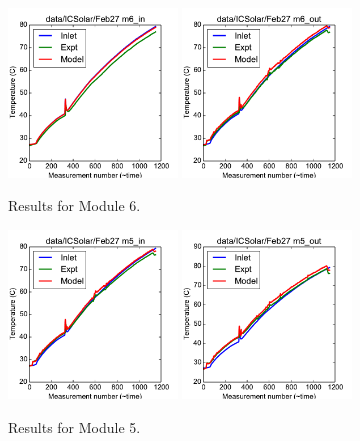 \documentclass{article}
\begin{document}
\begin{figure}[!ht]
\centering
\includegraphics[width=0.4\textwidth]{../../data/ICSolar/images/Feb27_m6_in.pdf}\hspace{0.05\textwidth}
\includegraphics[width=0.4\textwidth]{../../data/ICSolar/images/Feb27_m6_out.pdf}\hspace{0.05\textwidth}\\
\caption{Results for Module 6.}\end{figure}
\begin{figure}[!ht]
\centering
\includegraphics[width=0.4\textwidth]{../../data/ICSolar/images/Feb27_m5_in.pdf}\hspace{0.05\textwidth}
\includegraphics[width=0.4\textwidth]{../../data/ICSolar/images/Feb27_m5_out.pdf}\hspace{0.05\textwidth}\\
\caption{Results for Module 5.}\end{figure}
\end{document}
